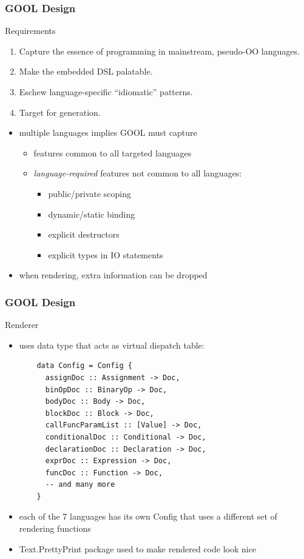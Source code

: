 \documentclass{beamer}
\begin{document}
\begin{frame}
\frametitle{GOOL Design}
{\Large Requirements}
\begin{enumerate}
\item Capture the essence of programming in mainstream, pseudo-OO languages.
\item Make the embedded DSL palatable.
\item Eschew language-specific ``idiomatic'' patterns.
\item Target for generation.
\end{enumerate}
\pause
\begin{itemize}
\item multiple languages implies GOOL must capture
\begin{itemize}
\item<3-> features common to all targeted languages
\item<4-> \emph{language-required} features not common to all languages:
\begin{itemize}
\item public/private scoping
\item dynamic/static binding
\item explicit destructors
\item explicit types in IO statements
\end{itemize}
\end{itemize}
\item<5-> when rendering, extra information can be dropped
\end{itemize}
\end{frame}

\begin{frame}
\frametitle{GOOL Design}
{\Large Renderer}
\begin{itemize} 
\item uses data type that acts as virtual dispatch table:
\begin{lstlisting}
    data Config = Config {
      assignDoc :: Assignment -> Doc,
      binOpDoc :: BinaryOp -> Doc,
      bodyDoc :: Body -> Doc,
      blockDoc :: Block -> Doc,
      callFuncParamList :: [Value] -> Doc,
      conditionalDoc :: Conditional -> Doc,
      declarationDoc :: Declaration -> Doc,
      exprDoc :: Expression -> Doc,
      funcDoc :: Function -> Doc,
      -- and many more
    }
\end{lstlisting}
\item each of the 7 languages has its own Config that uses a different set of rendering functions
\item Text.PrettyPrint package used to make rendered code look nice
\end{itemize}
\end{frame}
\end{document}
